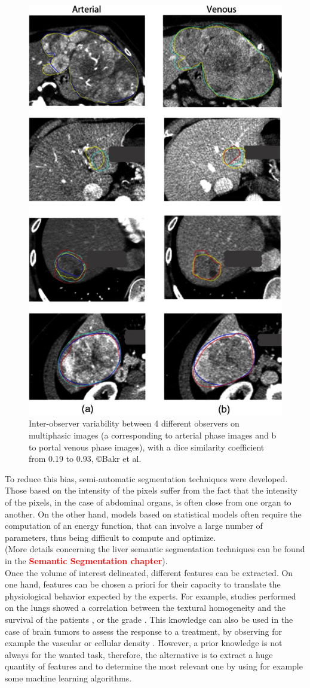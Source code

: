 \documentclass[]{article}
\begin{document}
\begin{figure}[th!]
	\centering
	\includegraphics[width=0.7\linewidth]{images/image14}
	\caption{Inter-observer variability between 4 different observers on multiphasic images (a corresponding to arterial phase images and b to portal venous phase images), with a dice similarity coefficient from 0.19 to 0.93, ©Bakr et al. \cite{Bakr2017}}
	\label{Bakr_Fig2}
\end{figure}


To reduce this bias, semi-automatic segmentation techniques were
developed. Those based on the intensity of the pixels suffer from the
fact that the intensity of the pixels, in the case of abdominal organs,
is often close from one organ to another. On the other hand, models
based on statistical models often require the computation of an energy
function, that can involve a large number of parameters, thus being
difficult to compute and optimize.\\
(More details concerning the liver semantic segmentation techniques can
be found in the \textcolor{red}{\textbf{Semantic Segmentation chapter}}).\\
Once the volume of interest delineated, different features can be
extracted. On one hand, features can be chosen a priori for their
capacity to translate the physiological behavior expected by the
experts. For example, studies performed on the lungs showed a
correlation between the textural homogeneity and the survival of the
patients \cite{Ganeshan2012,Balagurunathan2014}, or the grade
\cite{Al-Kadi2008}. This knowledge can also be used in the case of
brain tumors to assess the response to a treatment, by observing for
example the vascular or cellular density \cite{Cao2006,Zhou2014}. However, a prior knowledge is not always for the wanted
task, therefore, the alternative is to extract a huge quantity of
features and to determine the most relevant one by using for example
some machine learning algorithms.
\end{document}
